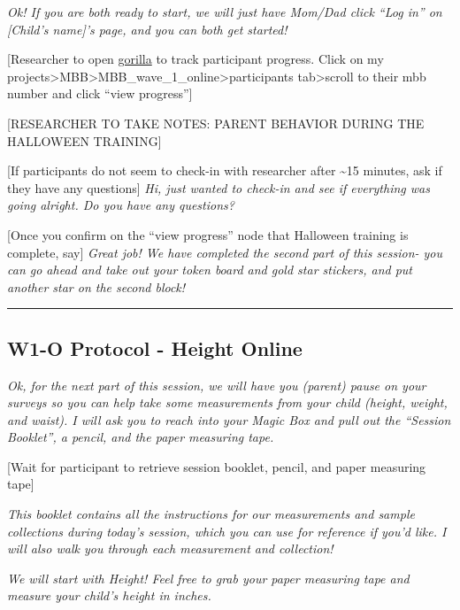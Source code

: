 \documentclass[]{book}
\begin{document}
\emph{Ok! If you are both ready to start, we will just have Mom/Dad click ``Log in'' on {[}Child's name{]}'s page, and you can both get started!}

{[}Researcher to open \href{https://gorilla.sc}{gorilla} to track participant progress. Click on my projects\textgreater{}MBB\textgreater{}MBB\_wave\_1\_online\textgreater{}participants tab\textgreater{}scroll to their mbb number and click ``view progress''{]}

{[}RESEARCHER TO TAKE NOTES: PARENT BEHAVIOR DURING THE HALLOWEEN TRAINING{]}

{[}If participants do not seem to check-in with researcher after \textasciitilde{}15 minutes, ask if they have any questions{]} \emph{Hi, just wanted to check-in and see if everything was going alright. Do you have any questions?}

{[}Once you confirm on the ``view progress'' node that Halloween training is complete, say{]} \emph{Great job! We have completed the second part of this session- you can go ahead and take out your token board and gold star stickers, and put another star on the second block!}

\begin{center}\rule{0.5\linewidth}{0.5pt}\end{center}

\hypertarget{w1-o-protocol---height-online}{%
\subsection{W1-O Protocol - Height Online}\label{w1-o-protocol---height-online}}

\emph{Ok, for the next part of this session, we will have you (parent) pause on your surveys so you can help take some measurements from your child (height, weight, and waist). I will ask you to reach into your Magic Box and pull out the ``Session Booklet'', a pencil, and the paper measuring tape.}

{[}Wait for participant to retrieve session booklet, pencil, and paper measuring tape{]}

\emph{This booklet contains all the instructions for our measurements and sample collections during today's session, which you can use for reference if you'd like. I will also walk you through each measurement and collection!}

\emph{We will start with Height! Feel free to grab your paper measuring tape and measure your child's height in inches.}
\end{document}
